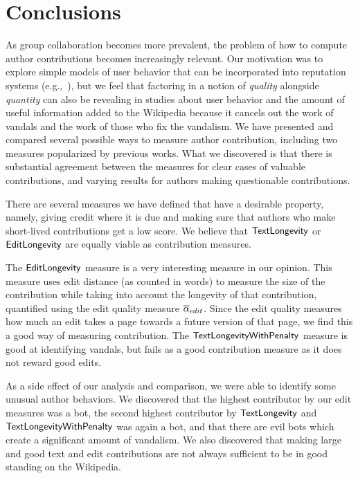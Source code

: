 \section{Conclusions}

As group collaboration becomes more prevalent,
the problem of how to compute author contributions
becomes increasingly relevant.
Our motivation was to explore simple models of user behavior
that can be incorporated into reputation
systems (e.g.,~\cite{www07}),
but we feel that factoring in a notion
of \textit{quality} alongside \textit{quantity}
can also be revealing in studies about
user behavior and the amount of useful information
added to the Wikipedia because it cancels out
the work of vandals and the work of those who
fix the vandalism.
We have presented and compared several possible ways to
measure author contribution, including
two measures popularized by previous works.
What we discovered is that there is substantial
agreement between the measures for clear
cases of valuable contributions, and
varying results for authors making
questionable contributions.

There are several measures we have defined that
have a desirable property, namely, giving credit
where it is due and making sure that authors who make short-lived 
contributions get a low score.
We believe that $\mathsf{TextLongevity}$ or $\mathsf{EditLongevity}$ are
equally viable as contribution measures.

The $\mathsf{EditLongevity}$ measure is a very interesting measure
in our opinion.
This measure uses edit distance (as counted in words)
to measure the size of the contribution while taking into
account the longevity of that contribution, quantified
using the edit quality measure ${\overline{\alpha}}_{edit}$.
Since the edit quality measures how much an edit takes a 
page towards a future version of that page, we find this
a good way of measuring contribution.
The $\mathsf{TextLongevityWithPenalty}$ measure is good at identifying vandals,
but fails as a good contribution measure as it does not
reward good edits.

As a side effect of our analysis and comparison, we were
able to identify some unusual author behaviors.
We discovered that the highest contributor by our edit 
measures was a bot, the second highest contributor by 
$\mathsf{TextLongevity}$ and $\mathsf{TextLongevityWithPenalty}$ was again a bot, and that there 
are evil bots which create a significant amount of vandalism.
We also discovered that making large and good text and edit
contributions are not always sufficient to be in good 
standing on the Wikipedia.


